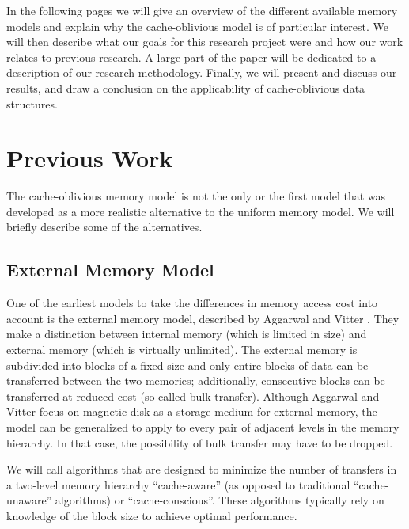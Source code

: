 \documentclass{acm_proc_article-sp}
\begin{document}
In the following pages we will give an overview of the different available memory models and explain why the cache-oblivious mod\-el is of particular interest. We will then describe what our goals for this research project were and how our work relates to previous research.
A large part of the paper will be dedicated to a description of our research methodology. Finally, we will present and discuss our results, and draw a conclusion on the applicability of cache-oblivious data structures.

\section{Previous Work}
The cache-oblivious memory model is not the only or the first model that was developed as a more realistic alternative to the uniform memory model. We will briefly describe some of the alternatives.

\subsection{External Memory Model}
One of the earliest models to take the differences in memory access cost into account is the external memory model, described by Aggarwal and Vitter \cite{aggarwal1988ioc}. They make a distinction between internal memory (which is limited in size) and external memory (which is virtually unlimited). The external memory is subdivided into blocks of a fixed size and only entire blocks of data can be transferred between the two memories; additionally, consecutive blocks can be transferred at reduced cost (so-called bulk transfer). Although Aggarwal and Vitter focus on magnetic disk as a storage medium for external memory, the model can be generalized to apply to every pair of adjacent levels in the memory hierarchy. In that case, the possibility of bulk transfer may have to be dropped.

We will call algorithms that are designed to minimize the number of transfers in a two-level memory hierarchy ``cache-aware'' (as opposed to traditional ``cache-unaware'' algorithms) or ``cache-conscious''. These algorithms typically rely on knowledge of the block size to achieve optimal performance.
\end{document}
